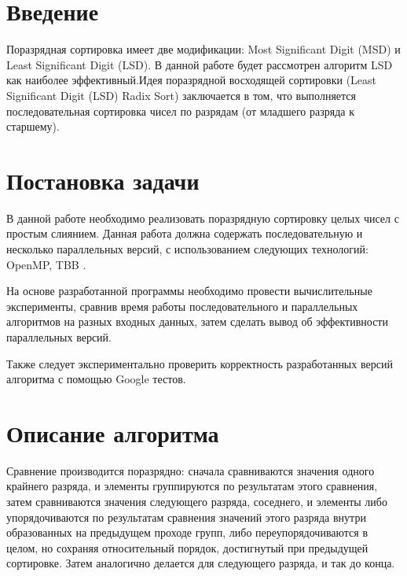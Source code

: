 \documentclass{report}
\begin{document}
\setcounter{page}{2}

\section*{Введение}
Поразрядная сортировка имеет две модификации: Most Significant Digit
(MSD) и Least Significant Digit (LSD). В данной работе будет рассмотрен
алгоритм LSD как наиболее эффективный.Идея поразрядной восходящей сортировки (Least Significant Digit (LSD) Radix Sort) заключается в том, что выполняется последовательная сортировка чисел по разрядам (от младшего разряда к старшему).
\newpage

\section*{Постановка задачи}
В данной работе необходимо реализовать поразрядную сортировку целых чисел с простым слиянием. Данная работа должна содержать последовательную и несколько параллельных версий, с использованием следующих технологий: OpenMP, TBB . 
\par
На основе разработанной программы необходимо провести вычислительные эксперименты, сравнив время работы последовательного и параллельных алгоритмов на разных входных данных, затем сделать вывод об эффективности параллельных версий.
\par
Также следует экспериментально проверить корректность разработанных версий алгоритма с помощью Google тестов.
\newpage

\section*{Описание алгоритма}
Сравнение производится поразрядно: сначала сравниваются значения одного крайнего разряда, и элементы группируются по результатам этого сравнения, затем сравниваются значения следующего разряда, соседнего, и элементы либо упорядочиваются по результатам сравнения значений этого разряда внутри образованных на предыдущем проходе групп, либо переупорядочиваются в целом, но сохраняя относительный порядок, достигнутый при предыдущей сортировке. Затем аналогично делается для следующего разряда, и так до конца.
\newpage

\end{document}
